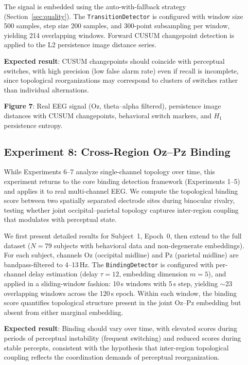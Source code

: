\documentclass[11pt,a4paper]{article}
\begin{document}
The signal is embedded using the auto-with-fallback strategy (Section~\ref{sec:quality}).
The \texttt{TransitionDetector} is configured with window size 500 samples, step size 200 samples, and 300-point subsampling per window, yielding 214 overlapping windows.
Forward CUSUM changepoint detection is applied to the L2 persistence image distance series.

\textbf{Expected result}: CUSUM changepoints should coincide with perceptual switches, with high precision (low false alarm rate) even if recall is incomplete, since topological reorganizations may correspond to clusters of switches rather than individual alternations.

\textbf{Figure 7}: Real EEG signal (Oz, theta--alpha filtered), persistence image distances with CUSUM changepoints, behavioral switch markers, and $H_1$ persistence entropy.

\subsection{Experiment 8: Cross-Region Oz--Pz Binding}\label{sec:exp-cross-binding}

While Experiments 6--7 analyze single-channel topology over time, this experiment returns to the core binding detection framework (Experiments 1--5) and applies it to real multi-channel EEG.
We compute the topological binding score between two spatially separated electrode sites during binocular rivalry, testing whether joint occipital--parietal topology captures inter-region coupling that modulates with perceptual state.

We first present detailed results for Subject~1, Epoch~0, then extend to the full dataset ($N = 79$ subjects with behavioral data and non-degenerate embeddings).
For each subject, channels Oz (occipital midline) and Pz (parietal midline) are bandpass-filtered to 4--13\,Hz.
The \texttt{BindingDetector} is configured with per-channel delay estimation (delay $\tau = 12$, embedding dimension $m = 5$), and applied in a sliding-window fashion: 10\,s windows with 5\,s step, yielding $\sim$23 overlapping windows across the 120\,s epoch.
Within each window, the binding score quantifies topological structure present in the joint Oz--Pz embedding but absent from either marginal embedding.

\textbf{Expected result}: Binding should vary over time, with elevated scores during periods of perceptual instability (frequent switching) and reduced scores during stable percepts, consistent with the hypothesis that inter-region topological coupling reflects the coordination demands of perceptual reorganization.
\end{document}
